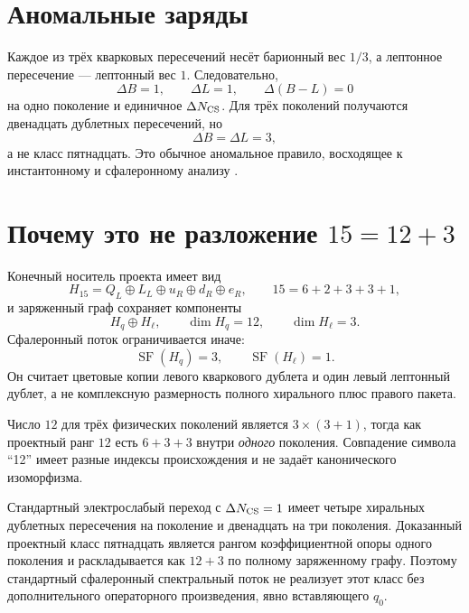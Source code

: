 \section{Аномальные заряды}

Каждое из трёх кварковых пересечений несёт барионный вес $1/3$, а
лептонное пересечение --- лептонный вес $1$. Следовательно,
\begin{equation}
 \Delta B=1,\qquad
 \Delta L=1,\qquad
 \Delta(B-L)=0
 \label{eq:v6-sphaleron-anomaly-one-generation}
\end{equation}
на одно поколение и единичное $\Delta N_{\rm CS}$. Для трёх поколений
получаются двенадцать дублетных пересечений, но
\begin{equation}
 \Delta B=\Delta L=3,
\end{equation}
а не класс пятнадцать. Это обычное аномальное правило, восходящее к
инстантонному и сфалеронному анализу
\cite{sphaleron-flow-thooft1976}.

\section{Почему это не разложение \texorpdfstring{$15=12+3$}{15=12+3}}

Конечный носитель проекта имеет вид
\begin{equation}
 H_{15}=Q_L\oplus L_L\oplus u_R\oplus d_R\oplus e_R,
 \qquad 15=6+2+3+3+1,
\end{equation}
и заряженный граф сохраняет компоненты
\begin{equation}
 H_q\oplus H_\ell,
 \qquad \dim H_q=12,
 \qquad \dim H_\ell=3.
\end{equation}
Сфалеронный поток ограничивается иначе:
\begin{equation}
 \operatorname{SF}(H_q)=3,
 \qquad
 \operatorname{SF}(H_\ell)=1.
 \label{eq:v6-sphaleron-flow-three-plus-one}
\end{equation}
Он считает цветовые копии левого кваркового дублета и один левый
лептонный дублет, а не комплексную размерность полного хирального плюс
правого пакета.

Число $12$ для трёх физических поколений является
$3\times(3+1)$, тогда как проектный ранг $12$ есть
$6+3+3$ внутри \emph{одного} поколения. Совпадение символа ``12'' имеет
разные индексы происхождения и не задаёт канонического изоморфизма.

\begin{theorem}
Стандартный электрослабый переход с $\Delta N_{\rm CS}=1$ имеет четыре
хиральных дублетных пересечения на поколение и двенадцать на три
поколения. Доказанный проектный класс пятнадцать является рангом
коэффициентной опоры одного поколения и раскладывается как $12+3$ по
полному заряженному графу. Поэтому стандартный сфалеронный спектральный
поток не реализует этот класс без дополнительного операторного
произведения, явно вставляющего $q_0$.
\end{theorem}

